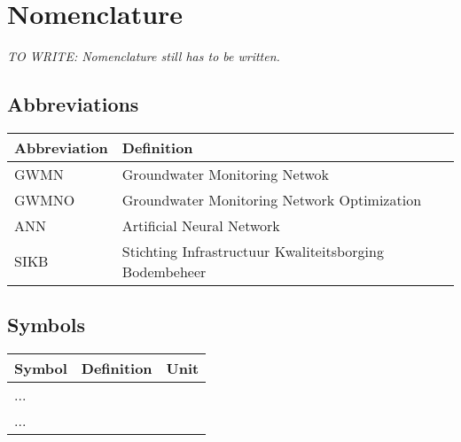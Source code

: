 \chapter*{Nomenclature}

\emph{TO WRITE: Nomenclature still has to be written.}

\section*{Abbreviations}

\begin{longtable}{p{2.5cm}p{8cm}}
    \toprule
    Abbreviation & Definition \\
    \midrule\endhead %
    GWMN & Groundwater Monitoring Netwok \\
    GWMNO & Groundwater Monitoring Network Optimization\\
    ANN & Artificial Neural Network \\
    SIKB & Stichting Infrastructuur Kwaliteitsborging Bodembeheer\\
    
    \bottomrule
\end{longtable}

\section*{Symbols}

\begin{longtable}{p{2.5cm}p{8cm}p{2.5cm}}
    \toprule
    Symbol & Definition & Unit \\
    \midrule\endhead %
    ... \\
    \midrule %
    ... \\
    \bottomrule
\end{longtable}
